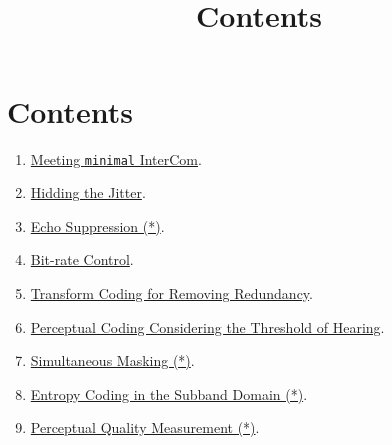 

\title{\TM{}\\Contents}

\maketitle

\section*{Contents}

\begin{enumerate}
\item \href{https://tecnologias-multimedia.github.io/contents/minimal/}{Meeting \texttt{minimal} InterCom}.
\item \href{https://tecnologias-multimedia.github.io/contents/jitter/}{Hidding the Jitter}.
\item \href{https://tecnologias-multimedia.github.io/contents/echo_suppression/}{Echo Suppression (*)}.
\item \href{https://tecnologias-multimedia.github.io/contents/BR_control/}{Bit-rate Control}.
\item \href{https://tecnologias-multimedia.github.io/contents/transform_coding/}{Transform Coding for Removing Redundancy}.
\item \href{https://tecnologias-multimedia.github.io/contents/threshold_of_hearing/}{Perceptual Coding Considering the Threshold of Hearing}.
\item \href{https://tecnologias-multimedia.github.io/contents/simultaneous_masking/}{Simultaneous Masking (*)}.
\item \href{https://tecnologias-multimedia.github.io/contents/entropy_coding/}{Entropy Coding in the Subband Domain (*)}.
\item \href{https://tecnologias-multimedia.github.io/contents/perceptual_quality/}{Perceptual Quality Measurement (*)}.  
\end{enumerate}

